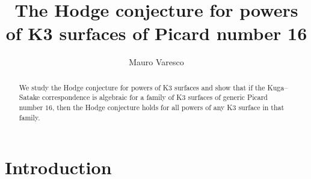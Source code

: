 \documentclass[11pt,twoside,a4paper]{amsart}
\newcommand{\0}{\mathscr{O}}
\theoremstyle{plain}
\theoremstyle{definition}
\theoremstyle{remark}
\begin{document}
\title[The Hodge conjecture for powers of K3 surfaces of Picard number 16]{The Hodge conjecture for powers of K3 surfaces of Picard number 16}  
\author[M. Varesco]{Mauro Varesco}
\address{Mathematisches Institut, Universit\"at Bonn, Endenicher Allee 60, 53115 Bonn, Germany}




\begin{abstract}
We study the Hodge conjecture for powers of K3 surfaces and show that if the Kuga--Satake correspondence is algebraic for a family of K3 surfaces of generic Picard number $16$, then the Hodge conjecture holds for all powers of any K3 surface in that family.
\end{abstract}
\maketitle

\section*{Introduction}
\end{document}
